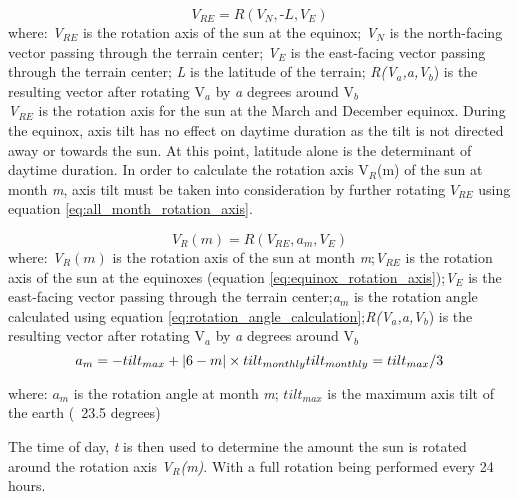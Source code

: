 \begin{equation} \label{eq:equinox_rotation_axis}
	V_{RE} = R(V_{N}, \textit{-L}, V_{E})
\end{equation}
where: \textit{V$_{RE}$} is the rotation axis of the sun at the equinox; \textit{V$_{N}$} is the north-facing vector passing through the terrain center; \textit{V$_{E}$} is the east-facing vector passing through the terrain center; \textit{L} is the latitude of the terrain; \textit{R(V$_{a}$,\textit{a},V$_{b}$}) is the resulting vector after rotating V$_{a}$ by \textit{a} degrees around V$_{b}$\\

\textit{V$_{RE}$} is the rotation axis for the sun at the March and December equinox. During the equinox, axis tilt has no effect on daytime duration as the tilt is not directed away or towards the sun. At this point, latitude alone is the determinant of daytime duration. In order to calculate the rotation axis V$_{R}$(m) of the sun at month \textit{m}, axis tilt must be taken into consideration by further rotating $V_{RE}$ using equation \ref{eq:all_month_rotation_axis}.

\begin{equation} \label{eq:all_month_rotation_axis}
	V_{R}(m) = R(V_{RE}, a_{m}, V_{E})
\end{equation}
where: \textit{V$_{R}(m)$} is the rotation axis of the sun at month \textit{m};\textit{V$_{RE}$} is the rotation axis of the sun at the equinoxes (equation \ref{eq:equinox_rotation_axis});\textit{V$_{E}$} is the east-facing vector passing through the terrain center;\textit{a$_{m}$} is the rotation angle calculated using equation \ref{eq:rotation_angle_calculation};\textit{R(V$_{a}$,\textit{a},V$_{b}$}) is the resulting vector after rotating V$_{a}$ by \textit{a} degrees around V$_{b}$\\

\begin{equation} \label{eq:rotation_angle_calculation}
	a_{m} = -tilt_{max} + |6-m| \times tilt_{monthly} $$\\
$$
tilt_{monthly} = tilt_{max}/3
\end{equation}

where: \textit{$a_{m}$} is the rotation angle at month \textit{m}; \textit{$tilt_{max}$} is the maximum axis tilt of the earth (~23.5 degrees)

The time of day, \textit{t} is then used to determine the amount the sun is rotated around the rotation axis \textit{V$_{R}$(m)}. With a full rotation being performed every 24 hours.

